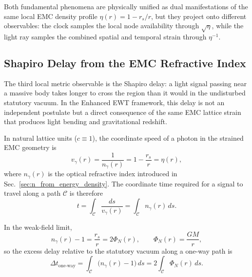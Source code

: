 \documentclass[10pt,a4paper]{article}
\begin{document}
Both fundamental phenomena are physically unified as dual
manifestations of the same local EMC density profile
\(\eta(r) = 1 - r_s/r\), but they project onto different
observables: the clock samples the local node availability through
\(\sqrt{\eta}\), while the light ray samples the combined spatial and
temporal strain through \(\eta^{-1}\).

\subsection{Shapiro Delay from the EMC Refractive Index}
\label{sec:shapiro_delay_emc}

The third local metric observable is the Shapiro delay: a light signal
passing near a massive body takes longer to cross the region than it
would in the undisturbed statutory vacuum. In the Enhanced EWT
framework, this delay is not an independent postulate but a direct
consequence of the same EMC lattice strain that produces light bending
and gravitational redshift.

In natural lattice units ($c \equiv 1$), the coordinate speed of a photon in the
strained EMC geometry is
\begin{equation}
	v_\gamma(r)
	=
	\frac{1}{n_\gamma(r)}
	=
	1 - \frac{r_s}{r}
	=
	\eta(r),
	\label{eq:photon_speed_shapiro}
\end{equation}
where \(n_\gamma(r)\) is the optical refractive index introduced in
Sec.~\ref{sec:n_from_energy_density}. The coordinate time required for
a signal to travel along a path \(\mathcal{C}\) is therefore
\begin{equation}
	t
	=
	\int_{\mathcal{C}}
	\frac{ds}{v_\gamma(r)}
	=
	\int_{\mathcal{C}}
	n_\gamma(r)\,ds .
	\label{eq:shapiro_general}
\end{equation}

In the weak-field limit,
\begin{equation}
	n_\gamma(r) - 1
	=
	\frac{r_s}{r}
	=
	2\Phi_N(r),
	\qquad
	\Phi_N(r)=\frac{GM}{r},
\end{equation}
so the excess delay relative to the statutory vacuum along a one-way path is
\begin{equation}
	\Delta t_{\text{one-way}}
	=
	\int_{\mathcal{C}}
	\bigl(n_\gamma(r)-1\bigr)\,ds
	=
	2\int_{\mathcal{C}}
	\Phi_N(r)\,ds .
	\label{eq:shapiro_weak}
\end{equation}
\end{document}
